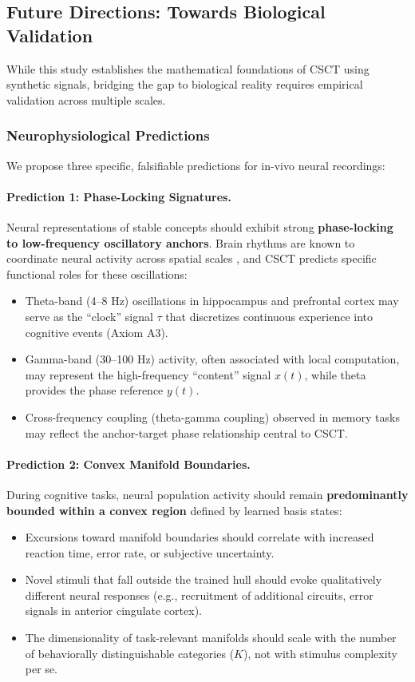 \documentclass{article}
\begin{document}
\subsection{Future Directions: Towards Biological Validation}

While this study establishes the mathematical foundations of CSCT using synthetic signals, bridging the gap to biological reality requires empirical validation across multiple scales.

\subsubsection{Neurophysiological Predictions}

We propose three specific, falsifiable predictions for in-vivo neural recordings:

\paragraph{Prediction 1: Phase-Locking Signatures.}
Neural representations of stable concepts should exhibit strong \textbf{phase-locking to low-frequency oscillatory anchors}.
Brain rhythms are known to coordinate neural activity across spatial scales \cite{buzsaki2006rhythms}, and CSCT predicts specific functional roles for these oscillations:
\begin{itemize}
    \item Theta-band (4--8 Hz) oscillations in hippocampus and prefrontal cortex may serve as the ``clock'' signal $\tau$ that discretizes continuous experience into cognitive events (Axiom A3).
    \item Gamma-band (30--100 Hz) activity, often associated with local computation, may represent the high-frequency ``content'' signal $x(t)$, while theta provides the phase reference $y(t)$.
    \item Cross-frequency coupling (theta-gamma coupling) observed in memory tasks~\cite{lisman2013theta} may reflect the anchor-target phase relationship central to CSCT.
\end{itemize}

\paragraph{Prediction 2: Convex Manifold Boundaries.}
During cognitive tasks, neural population activity should remain \textbf{predominantly bounded within a convex region} defined by learned basis states:
\begin{itemize}
    \item Excursions toward manifold boundaries should correlate with increased reaction time, error rate, or subjective uncertainty.
    \item Novel stimuli that fall outside the trained hull should evoke qualitatively different neural responses (e.g., recruitment of additional circuits, error signals in anterior cingulate cortex).
    \item The dimensionality of task-relevant manifolds should scale with the number of behaviorally distinguishable categories ($K$), not with stimulus complexity per se.
\end{itemize}
\end{document}
